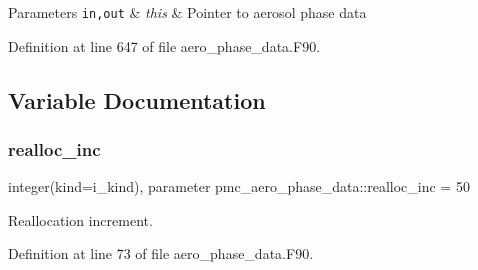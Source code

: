 \begin{DoxyParams}[1]{Parameters}
\mbox{\tt in,out}  & {\em this} & Pointer to aerosol phase data \\
\hline
\end{DoxyParams}


Definition at line 647 of file aero\+\_\+phase\+\_\+data.\+F90.



\subsection{Variable Documentation}
\mbox{\label{namespacepmc__aero__phase__data_a6d8f1bd0204f0436584df39dd4af35aa}} 
\subsubsection{\texorpdfstring{realloc\+\_\+inc}{realloc\_inc}}
{\footnotesize\ttfamily integer(kind=i\+\_\+kind), parameter pmc\+\_\+aero\+\_\+phase\+\_\+data\+::realloc\+\_\+inc = 50\hspace{0.3cm}{\ttfamily [private]}}



Reallocation increment. 



Definition at line 73 of file aero\+\_\+phase\+\_\+data.\+F90.

